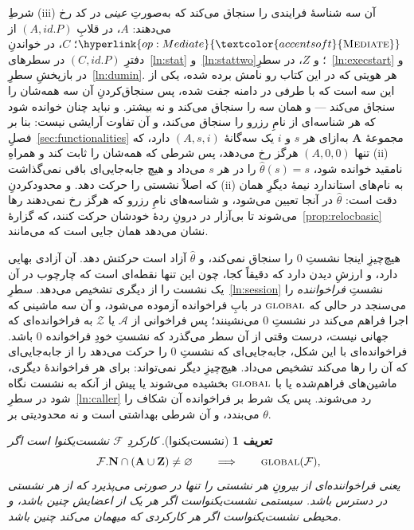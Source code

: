 \documentclass[10pt,oneside,openany]{book}
\renewcommand{\emptyset}{\varnothing}
\newcommand{\admits}{\mathbf{N}}
\newcommand{\Apid}{\mathbf{A}}
\newcommand{\Zpid}{\mathbf{Z}}
\newcommand{\F}{\mathcal{F}}
\newcommand{\Zenv}{\mathcal{Z}}
\newcommand{\Adv}{\mathcal{A}}
\newcommand{\op}[1]{\textnormal{\textsc{#1}}}
\newcommand{\opl}[1]{\hyperlink{op:#1}{\textcolor{accentsoft}{\op{#1}}}}
\newcommand{\id}{id}
\theoremstyle{accentdef}
\newtheorem{definition}{تعریف}[chapter]
\theoremstyle{accentplain}
\begin{document}
شرطِ (iii) آن سه شناسهٔ فرایندی را سنجاق می‌کند که به‌صورتِ \emph{عینی} در
کد رخ می‌دهند: $A$، در قلابِ $(A,\id.P)$ از $\opl{Mediate}$؛ $C$، در
خواندنِ دفترِ $(C,\id.P)$ در سطرهای~\ref{ln:stat} و~\ref{ln:stattwo}؛ و
$Z$، در سطرِ~\ref{ln:execstart} و در بازپخشِ سطرِ~\ref{ln:dumin}. هر هویتی
که در این کتاب رو نامش برده شده، یکی از این سه است که با طرفی در دامنه جفت
شده، پس سنجاق‌کردنِ آن سه همه‌شان را سنجاق می‌کند --- و همان سه را سنجاق
می‌کند و نه بیشتر. و نباید چنان خوانده شود که هر شناسه‌ای از نامِ رزرو را
سنجاق می‌کند، و آن تفاوت آرایشی نیست: بنا بر
فصلِ~\ref{sec:functionalities} مجموعهٔ $\Apid$ به‌ازای هر $s$ و $i$ یک
سه‌گانهٔ $(A,s,i)$ دارد، که تنها $(A,0,0)$ هرگز رخ می‌دهد، پس شرطی که
همه‌شان را ثابت کند و همراهِ (ii)ِ نامقید خوانده شود، $\hat\theta(s) = s$ را
در هر $s$ می‌داد و هیچ جابه‌جایی‌ای باقی نمی‌گذاشت که اصلاً نشستی را
حرکت دهد. و محدودکردنِ (ii) به نام‌های استاندارد نیمهٔ دیگرِ همان دقت است:
$\hat\theta$ در آنجا تعیین می‌شود، و شناسه‌های نامِ رزرو که هرگز رخ
نمی‌دهند رها می‌شوند تا بی‌آزار در درونِ ردهٔ خودشان حرکت کنند، که
گزارهٔ~\ref{prop:relocbasic} نشان می‌دهد همان جایی است که می‌مانند.

هیچ‌چیزِ اینجا نشستِ $0$ را سنجاق نمی‌کند، و $\hat\theta$ آزاد است حرکتش
دهد. آن آزادی بهایی دارد، و ارزشِ دیدن دارد که دقیقاً کجا، چون این تنها
نقطه‌ای است که چارچوب در آن یک نشست را از دیگری تشخیص می‌دهد.
سطرِ~\ref{ln:session} نشستِ \emph{فراخواننده} را می‌سنجد در حالی که
$\op{global}$ در بابِ فراخوانده آزموده می‌شود، و آن سه ماشینی که اجرا فراهم
می‌کند در نشستِ $0$ می‌نشینند؛ پس فراخوانی از $\Adv$ یا $\Zenv$ به
فراخوانده‌ای که جهانی نیست، درست وقتی از آن سطر می‌گذرد که نشستِ خودِ
فراخوانده $0$ باشد. فراخوانده‌ای با این شکل، جابه‌جایی‌ای که نشستِ $0$ را
حرکت می‌دهد را از جابه‌جایی‌ای که آن را رها می‌کند تشخیص می‌داد. هیچ‌چیزِ
دیگر نمی‌تواند: برای هر فراخواندهٔ دیگری، ماشین‌های فراهم‌شده یا با
$\op{global}$ بخشیده می‌شوند یا پیش از آنکه به نشست نگاه شود در
سطرِ~\ref{ln:caller} رد می‌شوند. پس یک شرط بر فراخوانده آن شکاف را
می‌بندد، و آن شرطی بهداشتی است و نه محدودیتی بر $\theta$.

\begin{definition}[نشست‌یکنوا]\label{def:sessunif}
کارکردِ $\F$ \emph{نشست‌یکنوا} است اگر
\[
  \F.\admits \cap (\Apid \cup \Zpid) \neq \emptyset
  \qquad\Longrightarrow\qquad
  \op{global}(\F) ,
\]
یعنی فراخواننده‌ای از بیرونِ هر نشستی را تنها در صورتی می‌پذیرد که از هر
نشستی در دسترس باشد. سیستمی نشست‌یکنواست اگر هر یک از اعضایش چنین باشد، و
محیطی نشست‌یکنواست اگر هر کارکردی که میهمان می‌کند چنین باشد.
\end{definition}
\end{document}
